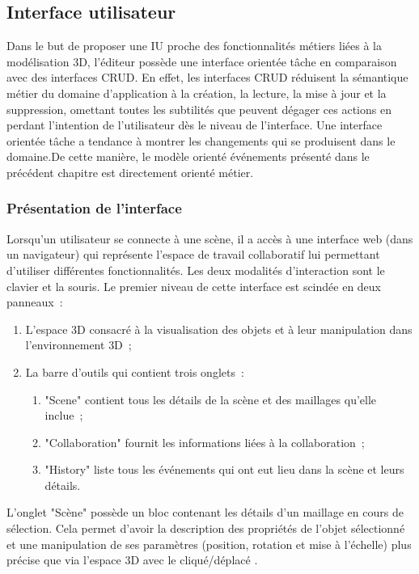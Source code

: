 \subsection{Interface utilisateur}
Dans le but de proposer une \gls{IU} proche des fonctionnalités métiers liées à la 
modélisation \gls{3D}, l'éditeur possède une interface orientée tâche en 
comparaison 
avec des interfaces CRUD. En effet, les interfaces CRUD réduisent la sémantique 
métier du domaine d'application à la création, la lecture, la mise à jour et la 
suppression, omettant toutes les subtilités que peuvent dégager ces actions en 
perdant l'intention de l'utilisateur dès le niveau de l'interface. Une 
interface orientée tâche a tendance à montrer les changements qui se produisent 
dans le domaine.De cette manière, le modèle orienté événements présenté dans 
le précédent chapitre est directement orienté métier. 
\subsubsection{Présentation de l'interface}

Lorsqu'un utilisateur se connecte à une scène, il a accès à une interface web 
(dans un navigateur) qui représente l'espace de travail collaboratif lui permettant 
d'utiliser différentes fonctionnalités. Les deux modalités d'interaction sont le clavier 
et la souris. Le premier niveau de cette 
interface est scindée en deux panneaux~: 
\begin{enumerate}
	\item L'espace \gls{3D} consacré à la visualisation des objets et à leur 
	manipulation 
	dans l'environnement \gls{3D}~;
	\item La barre d'outils qui contient trois onglets~:~
	\begin{enumerate}
		\item "Scene" contient tous les détails de la scène et des maillages qu'elle 
		inclue~; 
		\item "Collaboration" fournit les informations liées à la collaboration~;
		\item "History" liste tous les événements qui ont eut lieu dans la scène et 
		leurs  détails. 
	\end{enumerate}
\end{enumerate}

L'onglet "Scène" possède un bloc contenant les détails d'un maillage en cours de 
sélection. Cela permet d'avoir la description des propriétés de l'objet sélectionné et 
une manipulation de ses paramètres (position, rotation et mise à l'échelle) plus 
précise que via l'espace \gls{3D} avec le cliqué/déplacé .

